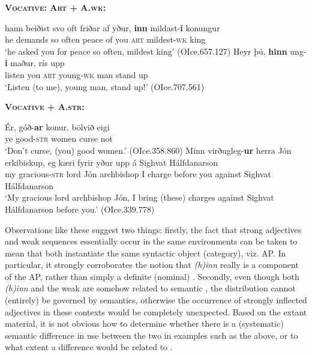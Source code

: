 \documentclass[output=paper,colorlinks,citecolor=brown]{langscibook}
\begin{document}
\begin{exe}
\ex \label{voc} \textbf{\textsc{Vocative: Art +  A.wk:}} %
    \begin{xlist}
         \ex\gll   hann beiðist svo oft friðar af yður, \textbf{inn} mildast-\textbf{i} konungur \\ 
         he demands so often peace of you \textsc{art} mildest-\textsc{wk} king   \\ 
         \glt `he asked you for peace so often, mildest king' (OIce.657.127)
         \ex \gll Heyr þú, \textbf{hinn} ung-\textbf{i} maður, rís upp \\  
         listen you \textsc{art} young-\textsc{wk} man stand up  \\ 
         \glt `Listen (to me), young man, stand up!' (OIce.707.561)

         \newpage
    \end{xlist}
    \ex \label{vocB} \textbf{\textsc{Vocative +  A.str:}}
    \begin{xlist} 
         \ex\gll Ér, góð-\textbf{ar} konur, bölvið eigi  \\
          ye good-\textsc{str} women curse not \\ 
          \glt `Don't curse, (you) good women.'   (OIce.358.860) 
         \ex \gll Minn virðugleg-\textbf{ur} herra Jón erkibiskup, eg  kæri fyrir yður {upp á} {Sighvat Hálfdanarson}   \\
          my gracious-\textsc{str} lord Jón archbishop I charge  before you against  {Sighvat Hálfdanarson} \\ 
          \glt `My gracious lord archbishop Jón, I bring (these) charges against Sighvat Hálfdanarson before you.' (OIce.339.778)
\end{xlist} 
\end{exe} 


Observations like these suggest two things: firstly, the fact that strong adjectives and weak sequences essentially occur in the same environments can be taken to mean that both instantiate the same syntactic object (category), viz. AP. In particular, it strongly corroborates the notion that \textit{(h)inn} really is a component of the AP, rather than simply a definite (nominal) .  
Secondly, even though both \textit{(h)inn} and the weak  are somehow related to semantic , the distribution cannot (entirely) be governed by semantics, otherwise the occurrence of strongly inflected adjectives  in these contexts would be completely unexpected. Based on the extant material, it is not obvious how to determine whether there is a (systematic) semantic difference in use between the two in examples such as the above, or to what extent a difference would be related to . 
\end{document}

